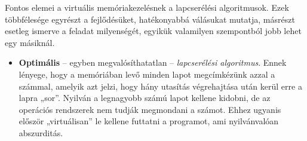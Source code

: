 \documentclass[tikz,12pt,margin=0px]{article}
\begin{document}
   \noindent Fontos elemei a virtuális memóriakezelésnek a lapcserélési algoritmusok. Ezek többfélesége egyrészt a fejlődésüket, hatékonyabbá válásukat mutatja, másrészt esetleg ismerve a feladat milyenségét, egyikük valamilyen szempontból jobb lehet egy másiknál.

    \begin{itemize}[topsep=8pt,itemsep=4pt,partopsep=4pt, parsep=4pt]
        \item \textbf{Optimális} – egyben megvalósíthatatlan – \emph{lapcserélési algoritmus}. Ennek lényege, hogy a memóriában levő minden lapot megcímkézünk azzal a számmal, amelyik azt jelzi, hogy hány utasítás végrehajtása után kerül erre a lapra „sor”. Nyilván a legnagyobb számú lapot kellene kidobni, de az operációs rendszerek nem tudják megmondani a számot. Ehhez ugyanis először „virtuálisan” le kellene futtatni a programot, ami nyilvánvalóan abszurditás.


\end{itemize}
\end{document}
